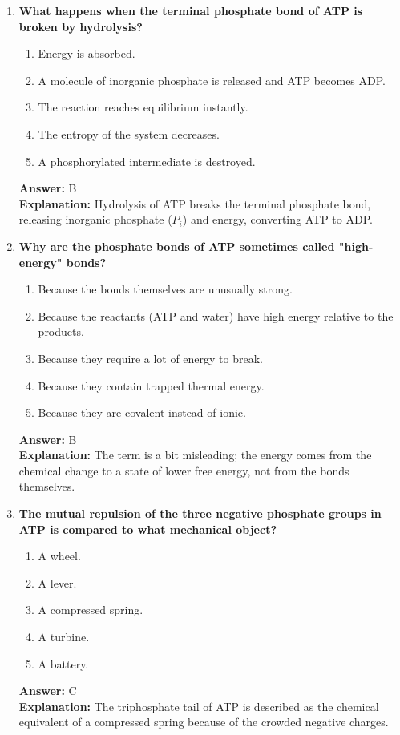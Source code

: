 \documentclass[11pt, a4paper]{article}
\begin{document}
\begin{enumerate}[leftmargin=*, label=\arabic*.]
\item \textbf{What happens when the terminal phosphate bond of ATP is broken by hydrolysis?}
\begin{enumerate}[label=\Alph*.]
    \item Energy is absorbed.
    \item A molecule of inorganic phosphate is released and ATP becomes ADP.
    \item The reaction reaches equilibrium instantly.
    \item The entropy of the system decreases.
    \item A phosphorylated intermediate is destroyed.
\end{enumerate}
\textbf{Answer:} B \\
\textbf{Explanation:} Hydrolysis of ATP breaks the terminal phosphate bond, releasing inorganic phosphate ($P_i$) and energy, converting ATP to ADP.

\item \textbf{Why are the phosphate bonds of ATP sometimes called "high-energy" bonds?}
\begin{enumerate}[label=\Alph*.]
    \item Because the bonds themselves are unusually strong.
    \item Because the reactants (ATP and water) have high energy relative to the products.
    \item Because they require a lot of energy to break.
    \item Because they contain trapped thermal energy.
    \item Because they are covalent instead of ionic.
\end{enumerate}
\textbf{Answer:} B \\
\textbf{Explanation:} The term is a bit misleading; the energy comes from the chemical change to a state of lower free energy, not from the bonds themselves.

\item \textbf{The mutual repulsion of the three negative phosphate groups in ATP is compared to what mechanical object?}
\begin{enumerate}[label=\Alph*.]
    \item A wheel.
    \item A lever.
    \item A compressed spring.
    \item A turbine.
    \item A battery.
\end{enumerate}
\textbf{Answer:} C \\
\textbf{Explanation:} The triphosphate tail of ATP is described as the chemical equivalent of a compressed spring because of the crowded negative charges.


\end{enumerate}
\end{document}
